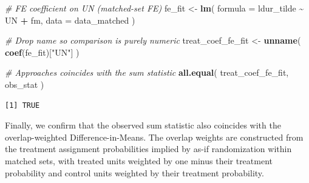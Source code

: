 \documentclass[
  12pt,
  leqno]{article}
\newenvironment{Shaded}{\begin{snugshade}}{\end{snugshade}}
\newcommand{\AttributeTok}[1]{\textcolor[rgb]{0.13,0.29,0.53}{#1}}
\newcommand{\CommentTok}[1]{\textcolor[rgb]{0.56,0.35,0.01}{\textit{#1}}}
\newcommand{\FunctionTok}[1]{\textcolor[rgb]{0.13,0.29,0.53}{\textbf{#1}}}
\newcommand{\NormalTok}[1]{#1}
\newcommand{\OtherTok}[1]{\textcolor[rgb]{0.56,0.35,0.01}{#1}}
\newcommand{\SpecialCharTok}[1]{\textcolor[rgb]{0.81,0.36,0.00}{\textbf{#1}}}
\newcommand{\StringTok}[1]{\textcolor[rgb]{0.31,0.60,0.02}{#1}}
\begin{document}
\singlespacing

\begin{Shaded}
\begin{Highlighting}[]
\CommentTok{\# FE coefficient on UN (matched{-}set FE)}
\NormalTok{fe\_fit }\OtherTok{\textless{}{-}} \FunctionTok{lm}\NormalTok{(}
  \AttributeTok{formula =}\NormalTok{ ldur\_tilde }\SpecialCharTok{\textasciitilde{}}\NormalTok{ UN }\SpecialCharTok{+}\NormalTok{ fm,}
  \AttributeTok{data =}\NormalTok{ data\_matched}
\NormalTok{)}

\CommentTok{\# Drop name so comparison is purely numeric}
\NormalTok{treat\_coef\_fe\_fit }\OtherTok{\textless{}{-}} \FunctionTok{unname}\NormalTok{(}
  \FunctionTok{coef}\NormalTok{(fe\_fit)[}\StringTok{"UN"}\NormalTok{]}
\NormalTok{)}

\CommentTok{\# Approaches coincides with the sum statistic}
\FunctionTok{all.equal}\NormalTok{(}
\NormalTok{  treat\_coef\_fe\_fit, obs\_stat}
\NormalTok{)}
\end{Highlighting}
\end{Shaded}

\begin{verbatim}
[1] TRUE
\end{verbatim}

\doublespacing

Finally, we confirm that the observed sum statistic also coincides with
the overlap-weighted Difference-in-Means. The overlap weights are
constructed from the treatment assignment probabilities implied by as-if
randomization within matched sets, with treated units weighted by one
minus their treatment probability and control units weighted by their
treatment probability.

\singlespacing
\end{document}
